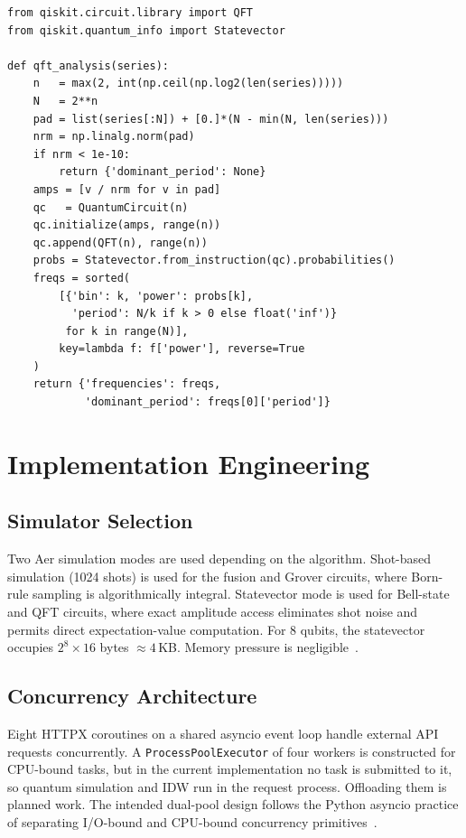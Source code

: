 \documentclass[conference]{IEEEtran}
\begin{document}
\begin{lstlisting}[caption={QFT temporal periodicity analysis.},
  label=lst:qft, float=t]
from qiskit.circuit.library import QFT
from qiskit.quantum_info import Statevector

def qft_analysis(series):
    n   = max(2, int(np.ceil(np.log2(len(series)))))
    N   = 2**n
    pad = list(series[:N]) + [0.]*(N - min(N, len(series)))
    nrm = np.linalg.norm(pad)
    if nrm < 1e-10:
        return {'dominant_period': None}
    amps = [v / nrm for v in pad]
    qc   = QuantumCircuit(n)
    qc.initialize(amps, range(n))
    qc.append(QFT(n), range(n))
    probs = Statevector.from_instruction(qc).probabilities()
    freqs = sorted(
        [{'bin': k, 'power': probs[k],
          'period': N/k if k > 0 else float('inf')}
         for k in range(N)],
        key=lambda f: f['power'], reverse=True
    )
    return {'frequencies': freqs,
            'dominant_period': freqs[0]['period']}
\end{lstlisting}


\section{Implementation Engineering}\label{sec:impl}

\subsection{Simulator Selection}

Two Aer simulation modes are used depending on the algorithm.
Shot-based simulation (1024 shots) is used for the fusion and Grover
circuits, where Born-rule sampling is algorithmically integral.
Statevector mode is used for Bell-state and QFT circuits, where exact
amplitude access eliminates shot noise and permits direct expectation-value
computation.
For 8 qubits, the statevector occupies $2^8 \times 16$ bytes $\approx 4$\,KB.
Memory pressure is negligible~\cite{bharti2022noisy}.

\subsection{Concurrency Architecture}

Eight HTTPX coroutines on a shared asyncio event loop handle external API
requests concurrently.
A \texttt{ProcessPoolExecutor} of four workers is constructed for CPU-bound
tasks, but in the current implementation no task is submitted to it, so
quantum simulation and IDW run in the request process.
Offloading them is planned work.
The intended dual-pool design follows the Python asyncio practice of
separating I/O-bound and CPU-bound concurrency
primitives~\cite{fastapi2023docs}.
\end{document}
